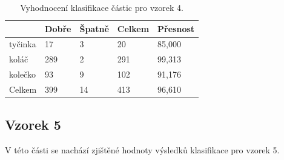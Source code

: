 \documentclass[11pt,twoside,a4paper,table]{book}
\begin{document}
\begin{table}[h]
\begin{center}
\begin{tabular}{lllll}
\rowcolor[HTML]{9B9B9B} 
\multicolumn{1}{|l|}{\cellcolor[HTML]{9B9B9B}Třída} & \multicolumn{1}{l|}{\cellcolor[HTML]{9B9B9B}Dobře} & \multicolumn{1}{l|}{\cellcolor[HTML]{9B9B9B}Špatně}  & \multicolumn{1}{l|}{\cellcolor[HTML]{9B9B9B}Celkem} & \multicolumn{1}{l|}{\cellcolor[HTML]{9B9B9B}Přesnost} \\ \hline
\multicolumn{1}{|l|}{tyčinka}                             & \multicolumn{1}{l|}{17}                            & \multicolumn{1}{l|}{3}                               & \multicolumn{1}{l|}{20}                             & \multicolumn{1}{l|}{85,000}                           \\ \hline
\multicolumn{1}{|l|}{koláč}                             & \multicolumn{1}{l|}{289}                           & \multicolumn{1}{l|}{2}                               & \multicolumn{1}{l|}{291}                            & \multicolumn{1}{l|}{99,313}                           \\ \hline
\multicolumn{1}{|l|}{kolečko}                             & \multicolumn{1}{l|}{93}                            & \multicolumn{1}{l|}{9}                               & \multicolumn{1}{l|}{102}                            & \multicolumn{1}{l|}{91,176}                           \\ \hline
\multicolumn{1}{|l|}{Celkem}                        & \multicolumn{1}{l|}{399}                           & \multicolumn{1}{l|}{14}                              & \multicolumn{1}{l|}{413}                            & \multicolumn{1}{l|}{96,610}                           \\ \hline
\end{tabular}
\end{center}
\caption{Vyhodnocení klasifikace částic pro vzorek 4.}
\label{tab:classresult5}
\end{table}

\newpage
\FloatBarrier
\subsection{Vzorek 5}
V této části se nachází zjištěné hodnoty výsledků klasifikace pro vzorek 5.
\end{document}
